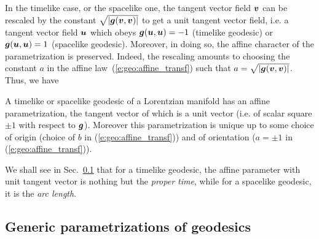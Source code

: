 In the timelike case, or the spacelike one,
the tangent vector field $\bm{v}$ can be rescaled by the constant $\sqrt{|\bm{g}(\bm{v},\bm{v})|}$ to get
a unit tangent vector field, i.e. a tangent vector field $\bm{u}$ which obeys
$\bm{g}(\bm{u},\bm{u}) = -1$ (timelike geodesic) or $\bm{g}(\bm{u},\bm{u}) = 1$
(spacelike geodesic). Moreover, in doing so, the affine character of the
parametrization is preserved. Indeed, the rescaling amounts to choosing the constant $a$
in the affine law~(\ref{e:geo:affine_transf}) such that $a = \sqrt{|\bm{g}(\bm{v},\bm{v})|}$.
Thus, we have
\begin{greybox}
A timelike or spacelike geodesic of a Lorentzian manifold has an affine parametrization,
the tangent vector of which is a unit vector (i.e. of scalar square $\pm 1$ with respect to
$\bm{g}$). Moreover this parametrization is unique up to some choice of origin
(choice of $b$ in (\ref{e:geo:affine_transf})) and of
orientation ($a=\pm 1$ in (\ref{e:geo:affine_transf})).
\end{greybox}
We shall see in Sec.~\ref{s:geo:gener_param} that for a timelike geodesic,
the affine parameter with unit tangent vector is nothing but the
\emph{proper time}, while for a spacelike
geodesic, it is the \emph{arc length}.

\subsection{Generic parametrizations of geodesics} \label{s:geo:gener_param}

